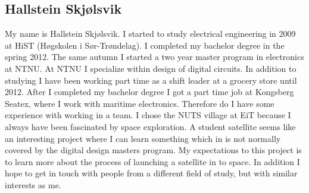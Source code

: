\subsection{Hallstein Skjølsvik}
My name is Hallstein Skjølsvik. I started to study electrical engineering in 2009 at HiST (Høgskolen i Sør-Trøndelag). I completed my bachelor degree in the spring 2012. The same autumn I started a two year master program in electronics at NTNU. At NTNU I specialize within design of digital circuits. In addition to studying I have been working part time as a shift leader at a grocery store until 2012. After I completed my bachelor degree I got a part time job at Kongsberg Seatex, where I work with maritime electronics. Therefore do I have some experience with working in a team. 
	I chose the NUTS village at EiT because I always have been fascinated by space exploration. A student satellite seems like an interesting project where I can learn something which in is not normally covered by the digital design masters program. My expectations to this project is to learn more about the process of launching a satellite in to space. In addition I hope to get in touch with people from a different field of study, but with similar interests as me.